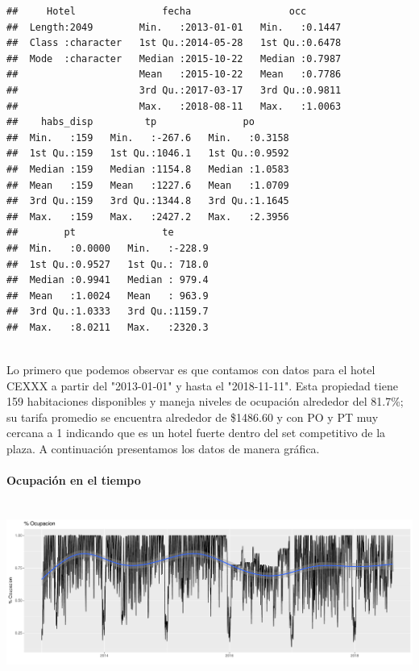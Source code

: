 \documentclass{article}\usepackage[]{graphicx}\usepackage[]{color}
\makeatletter
\def\maxwidth{ %
  \ifdim\Gin@nat@width>\linewidth
    \linewidth
  \else
    \Gin@nat@width
  \fi
}
\newenvironment{kframe}{%
 \def\at@end@of@kframe{}%
 \ifinner\ifhmode%
  \def\at@end@of@kframe{\end{minipage}}%
  \begin{minipage}{\columnwidth}%
 \fi\fi%
 \def\FrameCommand##1{\hskip\@totalleftmargin \hskip-\fboxsep
 \colorbox{shadecolor}{##1}\hskip-\fboxsep
     \hskip-\linewidth \hskip-\@totalleftmargin \hskip\columnwidth}%
 \MakeFramed {\advance\hsize-\width
   \@totalleftmargin\z@ \linewidth\hsize
   \@setminipage}}%
 {\par\unskip\endMakeFramed%
 \at@end@of@kframe}
\newenvironment{knitrout}{}{} %
\makeatother
\begin{document}
\begin{knitrout}
\color{fgcolor}\begin{kframe}
\begin{verbatim}
##     Hotel               fecha                 occ        
##  Length:2049        Min.   :2013-01-01   Min.   :0.1447  
##  Class :character   1st Qu.:2014-05-28   1st Qu.:0.6478  
##  Mode  :character   Median :2015-10-22   Median :0.7987  
##                     Mean   :2015-10-22   Mean   :0.7786  
##                     3rd Qu.:2017-03-17   3rd Qu.:0.9811  
##                     Max.   :2018-08-11   Max.   :1.0063  
##    habs_disp         tp               po        
##  Min.   :159   Min.   :-267.6   Min.   :0.3158  
##  1st Qu.:159   1st Qu.:1046.1   1st Qu.:0.9592  
##  Median :159   Median :1154.8   Median :1.0583  
##  Mean   :159   Mean   :1227.6   Mean   :1.0709  
##  3rd Qu.:159   3rd Qu.:1344.8   3rd Qu.:1.1645  
##  Max.   :159   Max.   :2427.2   Max.   :2.3956  
##        pt               te        
##  Min.   :0.0000   Min.   :-228.9  
##  1st Qu.:0.9527   1st Qu.: 718.0  
##  Median :0.9941   Median : 979.4  
##  Mean   :1.0024   Mean   : 963.9  
##  3rd Qu.:1.0333   3rd Qu.:1159.7  
##  Max.   :8.0211   Max.   :2320.3
\end{verbatim}
\end{kframe}
\end{knitrout}
~\\
Lo primero que podemos observar es que contamos con datos para el hotel CEXXX a partir del "2013-01-01" y hasta el "2018-11-11". Esta propiedad tiene 159 habitaciones disponibles y maneja niveles de ocupación alrededor del 81.7\%; su tarifa promedio se encuentra alrededor de \$1486.60 y con PO y PT muy cercana a 1 indicando que es un hotel fuerte dentro del set competitivo de la plaza.
A continuación presentamos los datos de manera gráfica.
\paragraph{Ocupación en el tiempo} ~\\
\begin{knitrout}
\color{fgcolor}
\includegraphics[width=\maxwidth]{figures/IndicadoresOcupacion-1} 

\end{knitrout}
\end{document}
